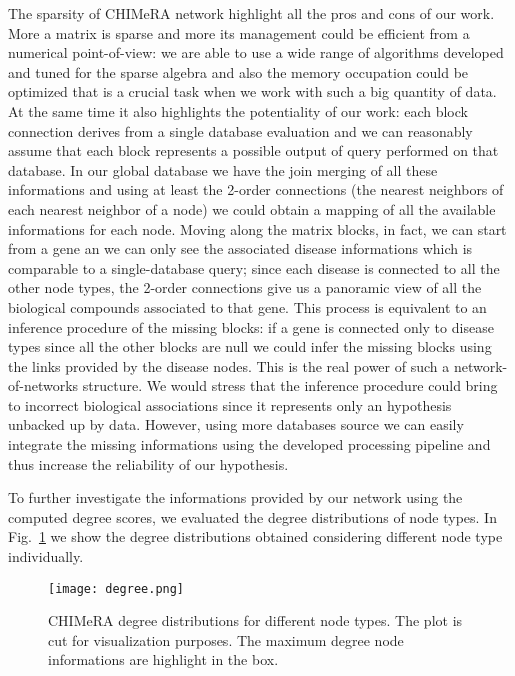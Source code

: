 \documentclass{standalone}
\begin{document}
The sparsity of \textsf{CHIMeRA} network highlight all the pros and cons of our work.
More a matrix is sparse and more its management could be efficient from a numerical point-of-view: we are able to use a wide range of algorithms developed and tuned for the sparse algebra and also the memory occupation could be optimized that is a crucial task when we work with such a big quantity of data.
At the same time it also highlights the potentiality of our work: each block connection derives from a single database evaluation and we can reasonably assume that each block represents a possible output of query performed on that database.
In our global database we have the join merging of all these informations and using at least the 2-order connections (the nearest neighbors of each nearest neighbor of a node) we could obtain a mapping of all the available informations for each node.
Moving along the matrix blocks, in fact, we can start from a gene an we can only see the associated disease informations which is comparable to a single-database query; since each disease is connected to all the other node types, the 2-order connections give us a panoramic view of all the biological compounds associated to that gene.
This process is equivalent to an inference procedure of the missing blocks: if a gene is connected only to disease types since all the other blocks are null we could infer the missing blocks using the links provided by the disease nodes.
This is the real power of such a network-of-networks structure.
We would stress that the inference procedure could bring to incorrect biological associations since it represents only an hypothesis unbacked up by data.
However, using more databases source we can easily integrate the missing informations using the developed processing pipeline and thus increase the reliability of our hypothesis.

To further investigate the informations provided by our network using the computed degree scores, we evaluated the degree distributions of node types.
In Fig.~\ref{fig:chimera_degree} we show the degree distributions obtained considering different node type individually.

\begin{figure}[htbp]
\centering
\texttt{[image: degree.png]}
\caption{CHIMeRA degree distributions for different node types.
The plot is cut for visualization purposes.
The maximum degree node informations are highlight in the box.
}
\label{fig:chimera_degree}
\end{figure}
\end{document}
